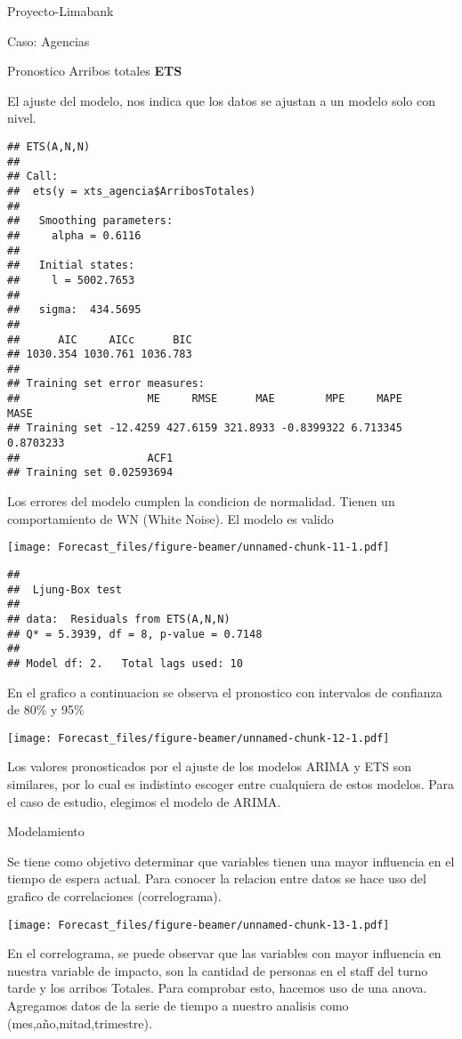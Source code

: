 \documentclass[
  ignorenonframetext,
]{beamer}
\begin{document}
\begin{frame}[fragile]{Proyecto-Limabank}
\begin{block}{Caso: Agencias}
\begin{block}{Pronostico Arribos totales}
\textbf{ETS}

El ajuste del modelo, nos indica que los datos se ajustan a un modelo
solo con nivel.

\begin{verbatim}
## ETS(A,N,N) 
## 
## Call:
##  ets(y = xts_agencia$ArribosTotales) 
## 
##   Smoothing parameters:
##     alpha = 0.6116 
## 
##   Initial states:
##     l = 5002.7653 
## 
##   sigma:  434.5695
## 
##      AIC     AICc      BIC 
## 1030.354 1030.761 1036.783 
## 
## Training set error measures:
##                    ME     RMSE      MAE        MPE     MAPE      MASE
## Training set -12.4259 427.6159 321.8933 -0.8399322 6.713345 0.8703233
##                    ACF1
## Training set 0.02593694
\end{verbatim}

Los errores del modelo cumplen la condicion de normalidad. Tienen un
comportamiento de WN (White Noise). El modelo es valido

\texttt{[image: Forecast\_files/figure-beamer/unnamed-chunk-11-1.pdf]}

\begin{verbatim}
## 
##  Ljung-Box test
## 
## data:  Residuals from ETS(A,N,N)
## Q* = 5.3939, df = 8, p-value = 0.7148
## 
## Model df: 2.   Total lags used: 10
\end{verbatim}

En el grafico a continuacion se observa el pronostico con intervalos de
confianza de 80\% y 95\%

\texttt{[image: Forecast\_files/figure-beamer/unnamed-chunk-12-1.pdf]}

Los valores pronosticados por el ajuste de los modelos ARIMA y ETS son
similares, por lo cual es indistinto escoger entre cualquiera de estos
modelos. Para el caso de estudio, elegimos el modelo de ARIMA.

\end{block}

\begin{block}{Modelamiento}

Se tiene como objetivo determinar que variables tienen una mayor
influencia en el tiempo de espera actual. Para conocer la relacion entre
datos se hace uso del grafico de correlaciones (correlograma).

\texttt{[image: Forecast\_files/figure-beamer/unnamed-chunk-13-1.pdf]}

En el correlograma, se puede observar que las variables con mayor
influencia en nuestra variable de impacto, son la cantidad de personas
en el staff del turno tarde y los arribos Totales. Para comprobar esto,
hacemos uso de una anova. Agregamos datos de la serie de tiempo a
nuestro analisis como (mes,año,mitad,trimestre).


\end{block}
\end{block}
\end{frame}
\end{document}
